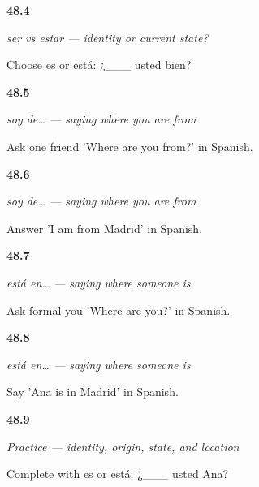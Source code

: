 \noindent\begin{minipage}[t]{\linewidth}
\raggedright
\hypertarget{review-ES-C09-ser-vs-estar-state}{\textbf{48.4}} \emph{ser vs estar — identity or current state?}\par
\small Choose es or está: ¿\_\_\_ usted bien?
\end{minipage}\par\medskip

\noindent\begin{minipage}[t]{\linewidth}
\raggedright
\hypertarget{review-ES-C09-soy-de-ask-origin}{\textbf{48.5}} \emph{soy de… — saying where you are from}\par
\small Ask one friend 'Where are you from?' in Spanish.
\end{minipage}\par\medskip

\noindent\begin{minipage}[t]{\linewidth}
\raggedright
\hypertarget{review-ES-C09-soy-de-madrid}{\textbf{48.6}} \emph{soy de… — saying where you are from}\par
\small Answer 'I am from Madrid' in Spanish.
\end{minipage}\par\medskip

\noindent\begin{minipage}[t]{\linewidth}
\raggedright
\hypertarget{review-ES-C09-esta-en-ask-formal}{\textbf{48.7}} \emph{está en… — saying where someone is}\par
\small Ask formal you 'Where are you?' in Spanish.
\end{minipage}\par\medskip

\noindent\begin{minipage}[t]{\linewidth}
\raggedright
\hypertarget{review-ES-C09-esta-en-ana}{\textbf{48.8}} \emph{está en… — saying where someone is}\par
\small Say 'Ana is in Madrid' in Spanish.
\end{minipage}\par\medskip

\noindent\begin{minipage}[t]{\linewidth}
\raggedright
\hypertarget{review-ES-C09-practice-identity}{\textbf{48.9}} \emph{Practice — identity, origin, state, and location}\par
\small Complete with es or está: ¿\_\_\_ usted Ana?
\end{minipage}\par\medskip

